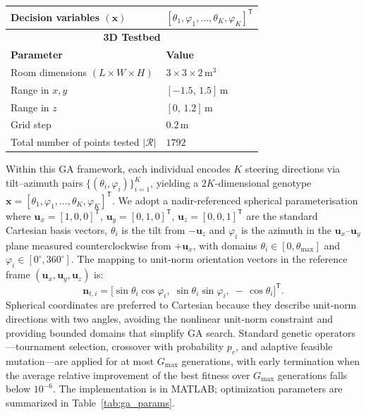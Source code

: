 \documentclass[journal]{IEEEtran}
\newcommand{\added}[1]{{\color{blue}#1}}
\begin{document}
\begin{table}[tbh]
\begin{tabular}{|l|l|}
Decision variables $(\mathbf x)$    & \([\theta_{1},\varphi_{1},\dots,\theta_{K},\varphi_{K}]^{\mathsf T}\) \\ \hline
\multicolumn{2}{|c|}{\textbf{3D Testbed}} \\ \hline
\textbf{Parameter}                  & \textbf{Value}                         \\ \hline
Room dimensions \((L\times W \times H)\) & \(3 \times 3 \times 2\,\mathrm{m^3}\)  \\ \hline
Range in \(x,y\)                    & \([-1.5,\,1.5]\,\mathrm{m}\)           \\ \hline
Range in \(z\)                      & \([0,\,1.2]\,\mathrm{m}\)              \\ \hline
Grid step                           & \(0.2\,\mathrm{m}\)                    \\ \hline
Total number of points tested \added{$|\mathcal{R}|$}  & \(1792\)                               \\ \hline
\end{tabular}
\end{table}

Within this GA framework, each individual encodes \(K\) steering directions via tilt–azimuth pairs
\(\{(\theta_i,\varphi_i)\}_{i=1}^{K}\), yielding a \(2K\)-dimensional genotype
\(\mathbf x = [\theta_1,\varphi_1,\dots,\theta_K,\varphi_K]^{\mathsf T}\).
We adopt a nadir‐referenced spherical parameterisation \added{where $\mathbf u_x=[1,0,0]^{\mathsf T}$, $\mathbf u_y=[0,1,0]^{\mathsf T}$, $\mathbf u_z=[0,0,1]^{\mathsf T}$ are the standard Cartesian basis vectors,} \(\theta_i\) is the tilt from \(-\mathbf u_z\) and \(\varphi_i\) is the azimuth in the \(\mathbf u_x\)–\( \mathbf u_y\) plane measured counterclockwise from \(+\mathbf u_x\),
with domains \(\theta_i\in[0,\theta_{\max}]\) and \(\varphi_i\in[0^\circ,360^\circ]\). %
The mapping to unit‐norm orientation vectors in the reference frame \((\mathbf u_x,\mathbf u_y,\mathbf u_z)\) is:
\begin{equation}
\mathbf n_{t,i}
= \bigl[\sin\theta_i\cos\varphi_i,\;\sin\theta_i\sin\varphi_i,\;-\,\cos\theta_i\bigr]^{\mathsf T}.
\end{equation}
Spherical coordinates are preferred to Cartesian because they describe unit‐norm directions with two angles, avoiding the nonlinear unit‐norm constraint and providing bounded domains that simplify GA search.
Standard genetic operators—tournament selection, crossover with probability \(p_c\), and adaptive feasible mutation—are applied for at most \(G_{\max}\) generations, 
with early termination when the average relative improvement of the best fitness over \(G_{\max}\) generations falls below \(10^{-6}\).
The implementation is in MATLAB; optimization parameters are summarized in Table~\ref{tab:ga_params}.
\end{document}
